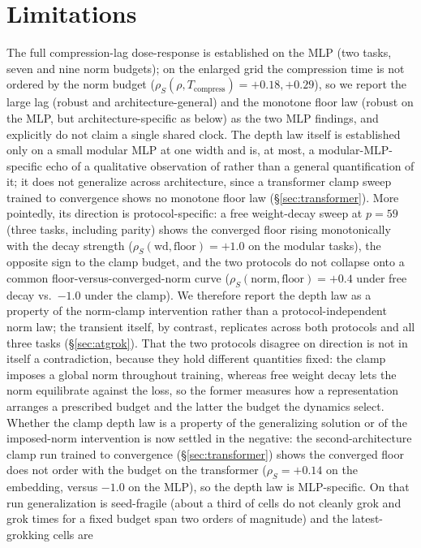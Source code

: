 \documentclass[11pt]{article}
\begin{document}
\section{Limitations}
\label{sec:limitations}
The full compression-lag dose-response is established on the MLP (two tasks, seven and nine norm
budgets); on the enlarged grid the compression time is not ordered by the norm budget
($\rho_S(\rho,T_{\mathrm{compress}})=+0.18,+0.29$), so we report the large lag (robust and
architecture-general) and the monotone floor law (robust on the MLP, but architecture-specific as below)
as the two MLP findings, and explicitly do not claim a single shared clock. The depth law itself is
established only on a small modular MLP at one width and is, at most, a modular-MLP-specific echo of a
qualitative observation of \citet{yunis2024spectral} rather than a general quantification of it; it does
not generalize across architecture, since a transformer clamp
sweep trained to convergence shows no monotone floor law (\S\ref{sec:transformer}). More pointedly, its
direction is protocol-specific: a free weight-decay sweep at $p=59$ (three tasks, including parity)
shows the converged floor rising monotonically with the decay strength ($\rho_S(\mathrm{wd},\text{floor})=
+1.0$ on the modular tasks), the opposite sign to the clamp budget, and the two protocols do not collapse
onto a common floor-versus-converged-norm curve ($\rho_S(\text{norm},\text{floor})=+0.4$ under free decay
vs.\ $-1.0$ under the clamp). We therefore report the depth law as a property of the norm-clamp
intervention rather than a protocol-independent norm law; the transient itself, by contrast, replicates
across both protocols and all three tasks (\S\ref{sec:atgrok}). That the two protocols disagree on
direction is not in itself a contradiction, because they hold different quantities fixed: the clamp
imposes a global norm throughout training, whereas free weight decay lets the norm equilibrate
against the loss, so the former measures how a representation arranges a prescribed budget and the
latter the budget the dynamics select. Whether the clamp depth law is a property of the generalizing
solution or of the imposed-norm intervention is now settled in the negative: the second-architecture
clamp run trained to convergence (\S\ref{sec:transformer}) shows the converged floor does not order with
the budget on the transformer ($\rho_S=+0.14$ on the embedding, versus $-1.0$ on the MLP), so the depth
law is MLP-specific. On that run generalization is seed-fragile (about a third of cells do not cleanly
grok and grok times for a fixed budget span two orders of magnitude) and the latest-grokking cells are
\end{document}
